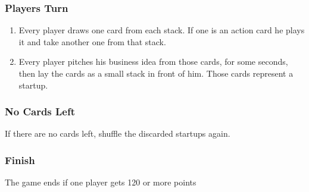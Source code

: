 \subsubsection*{Players Turn}
\begin{enumerate}
\item Every player draws one card from each stack. If one is an action card he plays it and take another one from that stack.
\item Every player pitches his business idea from those cards, for some seconds, then lay the cards as a small stack in
front of him. Those cards represent a startup.
\end{enumerate}

\subsubsection*{No Cards Left}
If there are no cards left, shuffle the discarded startups again.

\subsubsection*{Finish}
The game ends if one player gets 120 or more points
